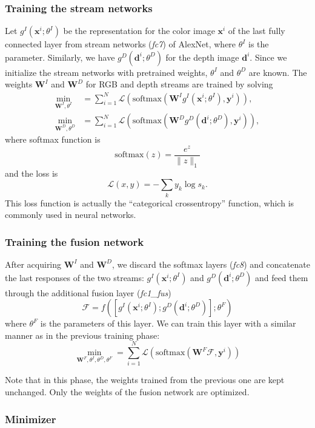 \subsubsection{Training the stream networks}
Let $g^I(\mathbf{x}^i; \theta^I)$ be the representation for the color image $\mathbf{x}^i$ of the last fully connected layer from stream networks (\textit{fc7}) of AlexNet, where $\theta^I$ is the parameter. Similarly, we have $g^D(\mathbf{d}^i; \theta^D)$ for the depth image $\mathbf{d}^i$. Since we initialize the stream networks with pretrained weights, $\theta^I$ and $\theta^D$ are known. The weights $\mathbf{W}^I$ and $\mathbf{W}^D$ for RGB and depth streams are trained by solving
\begin{align}
	\min_{\mathbf{W}^I,\theta^I} &= \sum_{i=1}^N \mathcal{L} \left( \text{softmax}\left(\mathbf{W}^I g^I \left(\mathbf{x}^i; \theta^I\right), \mathbf{y}^i\right)\right), \\
	\min_{\mathbf{W}^D,\theta^D} &= \sum_{i=1}^N \mathcal{L} \left( \text{softmax}\left(\mathbf{W}^D g^D \left(\mathbf{d}^i; \theta^D\right), \mathbf{y}^i\right)\right),
\end{align}
where softmax function is
\begin{equation}
	\text{softmax}(z) =\frac{e^z}{\lVert z \rVert_1}
\end{equation}
and the loss is
\begin{equation}
	\mathcal{L}(x,y) = -\sum_k y_k \log s_k.
\end{equation}
This loss function is actually the ``categorical crossentropy'' function, which is commonly used in neural networks.

\subsubsection{Training the fusion network}
After acquiring $\mathbf{W}^I$ and $\mathbf{W}^D$, we discard the softmax layers (\textit{fc8}) and concatenate the last responses of the two streams: $g^I(\mathbf{x}^i; \theta^I)$ and $g^D(\mathbf{d}^i; \theta^D)$ and feed them through the additional fusion layer (\textit{fc1\_fus})
\begin{equation}
	\mathcal{F} = f\left(\left[g^I(\mathbf{x}^i; \theta^I); g^D(\mathbf{d}^i; \theta^D)\right]; \theta^F\right)
\end{equation}
where $\theta^F$ is the parameters of this layer. We can train this layer with a similar manner as in the previous training phase:
\begin{equation}
	\min_{\mathbf{W}^F,\theta^I, \theta^D, \theta^F} = \sum_{i=1}^N \mathcal{L} \left( \text{softmax}\left(\mathbf{W}^F \mathcal{F}, \mathbf{y}^i\right)\right)
\end{equation}

Note that in this phase, the weights trained from the previous one are kept unchanged. Only the weights of the fusion network are optimized.

\subsubsection{Minimizer}
